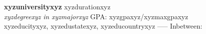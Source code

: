 \item \textbf{xyzuniversityxyz} \hfill xyzdurationxyz \\
\textit{xyzdegreexyz in xyzmajorxyz} \quad GPA: xyzgpaxyz/xyzmaxgpaxyz \\
xyzeducityxyz, xyzedustatexyz, xyzeducountryxyz
-----
Inbetween: \vspace{8pt}
